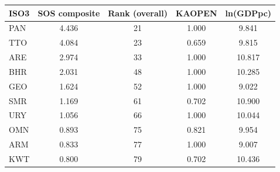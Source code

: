 \begin{tabular}{lcccc}
\toprule
ISO3 & SOS composite & Rank (overall) & KAOPEN & ln(GDPpc) \\
\midrule
PAN & 4.436 & 21 & 1.000 & 9.841 \\
TTO & 4.084 & 23 & 0.659 & 9.815 \\
ARE & 2.974 & 33 & 1.000 & 10.817 \\
BHR & 2.031 & 48 & 1.000 & 10.285 \\
GEO & 1.624 & 52 & 1.000 & 9.022 \\
SMR & 1.169 & 61 & 0.702 & 10.900 \\
URY & 1.056 & 66 & 1.000 & 10.044 \\
OMN & 0.893 & 75 & 0.821 & 9.954 \\
ARM & 0.833 & 77 & 1.000 & 9.007 \\
KWT & 0.800 & 79 & 0.702 & 10.436 \\
\bottomrule
\end{tabular}
